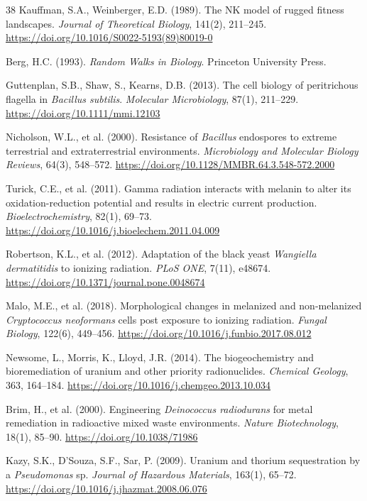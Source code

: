 \documentclass[11pt]{article}
\begin{document}
\begin{thebibliography}{38}
Kauffman, S.A., Weinberger, E.D. (1989).
The NK model of rugged fitness landscapes.
\textit{Journal of Theoretical Biology}, 141(2), 211--245.
\url{https://doi.org/10.1016/S0022-5193(89)80019-0}

Berg, H.C. (1993).
\textit{Random Walks in Biology}.
Princeton University Press.

Guttenplan, S.B., Shaw, S., Kearns, D.B. (2013).
The cell biology of peritrichous flagella in \textit{Bacillus subtilis}.
\textit{Molecular Microbiology}, 87(1), 211--229.
\url{https://doi.org/10.1111/mmi.12103}

Nicholson, W.L., et al. (2000).
Resistance of \textit{Bacillus} endospores to extreme terrestrial and extraterrestrial
environments.
\textit{Microbiology and Molecular Biology Reviews}, 64(3), 548--572.
\url{https://doi.org/10.1128/MMBR.64.3.548-572.2000}

Turick, C.E., et al. (2011).
Gamma radiation interacts with melanin to alter its oxidation-reduction potential and
results in electric current production.
\textit{Bioelectrochemistry}, 82(1), 69--73.
\url{https://doi.org/10.1016/j.bioelechem.2011.04.009}

Robertson, K.L., et al. (2012).
Adaptation of the black yeast \textit{Wangiella dermatitidis} to ionizing radiation.
\textit{PLoS ONE}, 7(11), e48674.
\url{https://doi.org/10.1371/journal.pone.0048674}

Malo, M.E., et al. (2018).
Morphological changes in melanized and non-melanized \textit{Cryptococcus neoformans} cells
post exposure to ionizing radiation.
\textit{Fungal Biology}, 122(6), 449--456.
\url{https://doi.org/10.1016/j.funbio.2017.08.012}

Newsome, L., Morris, K., Lloyd, J.R. (2014).
The biogeochemistry and bioremediation of uranium and other priority radionuclides.
\textit{Chemical Geology}, 363, 164--184.
\url{https://doi.org/10.1016/j.chemgeo.2013.10.034}

Brim, H., et al. (2000).
Engineering \textit{Deinococcus radiodurans} for metal remediation in radioactive mixed
waste environments.
\textit{Nature Biotechnology}, 18(1), 85--90.
\url{https://doi.org/10.1038/71986}

Kazy, S.K., D'Souza, S.F., Sar, P. (2009).
Uranium and thorium sequestration by a \textit{Pseudomonas} sp.
\textit{Journal of Hazardous Materials}, 163(1), 65--72.
\url{https://doi.org/10.1016/j.jhazmat.2008.06.076}


\end{thebibliography}
\end{document}
